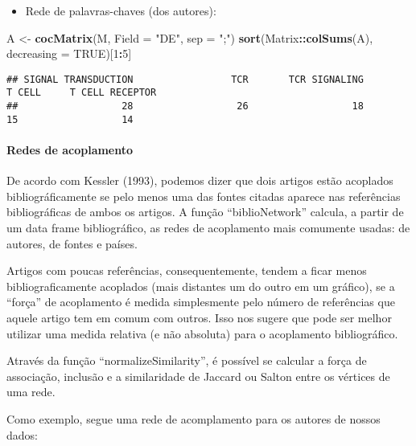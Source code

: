\documentclass[]{article}
\newenvironment{Shaded}{\begin{snugshade}}{\end{snugshade}}
\newcommand{\DataTypeTok}[1]{\textcolor[rgb]{0.13,0.29,0.53}{#1}}
\newcommand{\DecValTok}[1]{\textcolor[rgb]{0.00,0.00,0.81}{#1}}
\newcommand{\KeywordTok}[1]{\textcolor[rgb]{0.13,0.29,0.53}{\textbf{#1}}}
\newcommand{\NormalTok}[1]{#1}
\newcommand{\OperatorTok}[1]{\textcolor[rgb]{0.81,0.36,0.00}{\textbf{#1}}}
\newcommand{\OtherTok}[1]{\textcolor[rgb]{0.56,0.35,0.01}{#1}}
\newcommand{\StringTok}[1]{\textcolor[rgb]{0.31,0.60,0.02}{#1}}
\providecommand{\tightlist}{%
  \setlength{\itemsep}{0pt}\setlength{\parskip}{0pt}}
\let\oldparagraph\paragraph
\renewcommand{\paragraph}[1]{\oldparagraph{#1}\mbox{}}
\begin{document}
\begin{itemize}
\tightlist
\item
  Rede de palavras-chaves (dos autores):
\end{itemize}

\begin{Shaded}
\begin{Highlighting}[]
\NormalTok{A <-}\StringTok{ }\KeywordTok{cocMatrix}\NormalTok{(M, }\DataTypeTok{Field =} \StringTok{"DE"}\NormalTok{, }\DataTypeTok{sep =} \StringTok{";"}\NormalTok{)}
\KeywordTok{sort}\NormalTok{(Matrix}\OperatorTok{::}\KeywordTok{colSums}\NormalTok{(A), }\DataTypeTok{decreasing =} \OtherTok{TRUE}\NormalTok{)[}\DecValTok{1}\OperatorTok{:}\DecValTok{5}\NormalTok{]}
\end{Highlighting}
\end{Shaded}

\begin{verbatim}
## SIGNAL TRANSDUCTION                 TCR       TCR SIGNALING              T CELL     T CELL RECEPTOR 
##                  28                  26                  18                  15                  14
\end{verbatim}

\hypertarget{redes-de-acoplamento}{%
\paragraph{Redes de acoplamento}\label{redes-de-acoplamento}}

De acordo com Kessler (1993), podemos dizer que dois artigos estão
acoplados bibliográficamente se pelo menos uma das fontes citadas
aparece nas referências bibliográficas de ambos os artigos. A função
``biblioNetwork'' calcula, a partir de um data frame bibliográfico, as
redes de acoplamento mais comumente usadas: de autores, de fontes e
países.

Artigos com poucas referências, consequentemente, tendem a ficar menos
bibliograficamente acoplados (mais distantes um do outro em um gráfico),
se a ``força'' de acoplamento é medida simplesmente pelo número de
referências que aquele artigo tem em comum com outros. Isso nos sugere
que pode ser melhor utilizar uma medida relativa (e não absoluta) para o
acoplamento bibliográfico.

Através da função ``normalizeSimilarity'', é possível se calcular a
força de associação, inclusão e a similaridade de Jaccard ou Salton
entre os vértices de uma rede.

Como exemplo, segue uma rede de acomplamento para os autores de nossos
dados:
\end{document}
